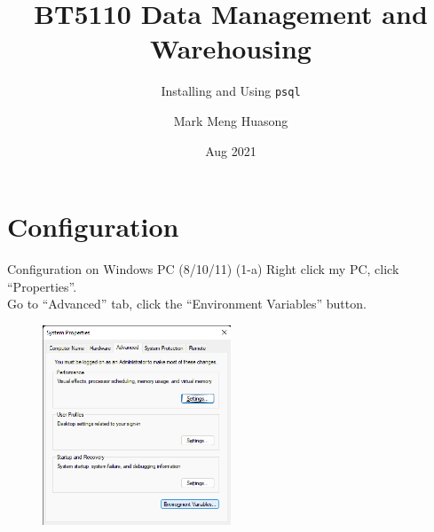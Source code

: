 \title{BT5110 Data Management and Warehousing}

\subtitle{Installing and Using \texttt{psql}}

\author{Mark Meng Huasong}



\date{Aug 2021}

\begin{frame}
	\titlepage
\end{frame}

\section*{Configuration}

\begin{frame}[fragile]{Configuration on Windows PC (8/10/11)}
	(1-a) Right click my PC, click ``Properties''. \\
	Go to ``Advanced'' tab, click the ``Environment Variables'' button.
	\begin{figure}
		\includegraphics[width=0.5\textwidth]{t0-psql/images/settings.png}
	\end{figure}
\end{frame}


